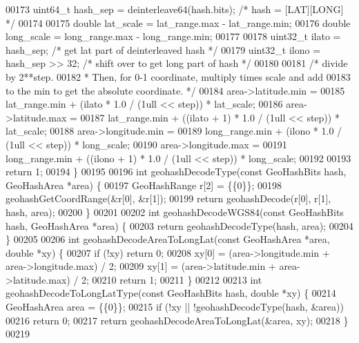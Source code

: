 \begin{DoxyCode}
00173     uint64\_t hash\_sep = deinterleave64(hash.bits); \textcolor{comment}{/* hash = [LAT][LONG] */}
00174 
00175     \textcolor{keywordtype}{double} lat\_scale = lat\_range.max - lat\_range.min;
00176     \textcolor{keywordtype}{double} long\_scale = long\_range.max - long\_range.min;
00177 
00178     uint32\_t ilato = hash\_sep;       \textcolor{comment}{/* get lat part of deinterleaved hash */}
00179     uint32\_t ilono = hash\_sep >> 32; \textcolor{comment}{/* shift over to get long part of hash */}
00180 
00181     \textcolor{comment}{/* divide by 2**step.}
00182 \textcolor{comment}{     * Then, for 0-1 coordinate, multiply times scale and add}
00183 \textcolor{comment}{       to the min to get the absolute coordinate. */}
00184     area->latitude.min =
00185         lat\_range.min + (ilato * 1.0 / (1ull << step)) * lat\_scale;
00186     area->latitude.max =
00187         lat\_range.min + ((ilato + 1) * 1.0 / (1ull << step)) * lat\_scale;
00188     area->longitude.min =
00189         long\_range.min + (ilono * 1.0 / (1ull << step)) * long\_scale;
00190     area->longitude.max =
00191         long\_range.min + ((ilono + 1) * 1.0 / (1ull << step)) * long\_scale;
00192 
00193     \textcolor{keywordflow}{return} 1;
00194 \}
00195 
00196 \textcolor{keywordtype}{int} geohashDecodeType(\textcolor{keyword}{const} GeoHashBits hash, GeoHashArea *area) \{
00197     GeoHashRange r[2] = \{\{0\}\};
00198     geohashGetCoordRange(&r[0], &r[1]);
00199     \textcolor{keywordflow}{return} geohashDecode(r[0], r[1], hash, area);
00200 \}
00201 
00202 \textcolor{keywordtype}{int} geohashDecodeWGS84(\textcolor{keyword}{const} GeoHashBits hash, GeoHashArea *area) \{
00203     \textcolor{keywordflow}{return} geohashDecodeType(hash, area);
00204 \}
00205 
00206 \textcolor{keywordtype}{int} geohashDecodeAreaToLongLat(\textcolor{keyword}{const} GeoHashArea *area, \textcolor{keywordtype}{double} *xy) \{
00207     \textcolor{keywordflow}{if} (!xy) \textcolor{keywordflow}{return} 0;
00208     xy[0] = (area->longitude.min + area->longitude.max) / 2;
00209     xy[1] = (area->latitude.min + area->latitude.max) / 2;
00210     \textcolor{keywordflow}{return} 1;
00211 \}
00212 
00213 \textcolor{keywordtype}{int} geohashDecodeToLongLatType(\textcolor{keyword}{const} GeoHashBits hash, \textcolor{keywordtype}{double} *xy) \{
00214     GeoHashArea area = \{\{0\}\};
00215     \textcolor{keywordflow}{if} (!xy || !geohashDecodeType(hash, &area))
00216         \textcolor{keywordflow}{return} 0;
00217     \textcolor{keywordflow}{return} geohashDecodeAreaToLongLat(&area, xy);
00218 \}
00219 

\end{DoxyCode}

